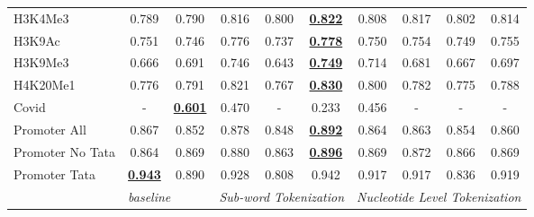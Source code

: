 \begin{table*}[h!]
\begin{center}
\begin{tabular}{l|cc|ccc|cccc}
H3K4Me3 & 0.789 & 0.790 & 0.816 & 0.800 & {\ul \textbf{0.822}} & 0.808 & 0.817 & 0.802 & 0.814 \\
H3K9Ac & 0.751 & 0.746 & 0.776 & 0.737 & {\ul \textbf{0.778}} & 0.750 & 0.754 & 0.749 & 0.755 \\
H3K9Me3 & 0.666 & 0.691 & 0.746 & 0.643 & {\ul \textbf{0.749}} & 0.714 & 0.681 & 0.667 & 0.697 \\
H4K20Me1 & 0.776 & 0.791 & 0.821 & 0.767 & {\ul \textbf{0.830}} & 0.800 & 0.782 & 0.775 & 0.788 \\
Covid & - & {\ul \textbf{0.601}} & 0.470 & - & 0.233 & 0.456 & - & - & - \\
Promoter All & 0.867 & 0.852 & 0.878 & 0.848 & {\ul \textbf{0.892}} & 0.864 & 0.863 & 0.854 & 0.860 \\
Promoter No Tata & 0.864 & 0.869 & 0.880 & 0.863 & {\ul \textbf{0.896}} & 0.869 & 0.872 & 0.866 & 0.869 \\
Promoter Tata & {\ul \textbf{0.943}} & 0.890 & 0.928 & 0.808 & 0.942 & 0.917 & 0.917 & 0.836 & 0.919 \\
\hline
 & \multicolumn{2}{l|}{\textit{baseline}} & \multicolumn{3}{c|}{\textit{Sub-word Tokenization}} & \multicolumn{4}{c}{\textit{Nucleotide Level Tokenization}} \\ \hline
\end{tabular}
\end{center}
\end{table*}
